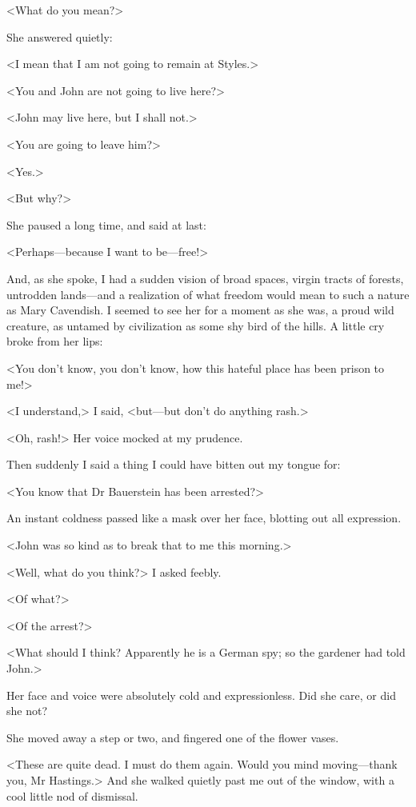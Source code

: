  <What do you mean?> 

 She answered quietly: 

 <I mean that I am not going to remain at Styles.> 

 <You and John are not going to live here?> 

 <John may live here, but I shall not.> 

 <You are going to leave him?> 

 <Yes.> 

 <But why?> 

 She paused a long time, and said at last: 

 <Perhaps—because I want to be—free!> 

 And, as she spoke, I had a sudden vision of broad spaces, virgin tracts of forests, untrodden lands—and a realization of what freedom would mean to such a nature as Mary Cavendish. I seemed to see her for a moment as she was, a proud wild creature, as untamed by civilization as some shy bird of the hills. A little cry broke from her lips: 

 <You don't know, you don't know, how this hateful place has been prison to me!> 

 <I understand,> I said, <but—but don't do anything rash.> 

 <Oh, rash!> Her voice mocked at my prudence. 

 Then suddenly I said a thing I could have bitten out my tongue for: 

 <You know that Dr Bauerstein has been arrested?> 

 An instant coldness passed like a mask over her face, blotting out all expression. 

 <John was so kind as to break that to me this morning.> 

 <Well, what do you think?> I asked feebly. 

 <Of what?> 

 <Of the arrest?> 

 <What should I think? Apparently he is a German spy; so the gardener had told John.> 

 Her face and voice were absolutely cold and expressionless. Did she care, or did she not? 

 She moved away a step or two, and fingered one of the flower vases. 

 <These are quite dead. I must do them again. Would you mind moving—thank you, Mr Hastings.> And she walked quietly past me out of the window, with a cool little nod of dismissal. 

